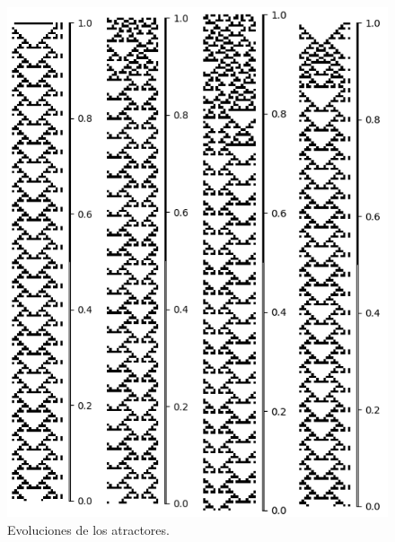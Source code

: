 \documentclass[11pt]{article}
\begin{document}
			\begin{figure}[H]
			\centering
			\includegraphics[scale=0.3]{resources/Atractores22/atractor_22_size_21_res.png}
			\caption{Evoluciones de los atractores.}\label{fig:picture}
			\end{figure}
\end{document}
